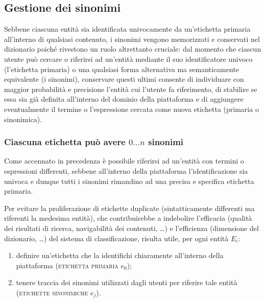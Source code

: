 \documentclass[10pt,a4paper,headinclude,footinclude,hidelinks]{scrreprt} %
\begin{document}

	\subsection{Gestione dei sinonimi}
	Sebbene ciascuna entità sia identificata univocamente da un'etichetta primaria all'interno di qualsiasi contenuto, i sinonimi vengono memorizzati e conservati nel dizionario poiché rivestono un ruolo altrettanto cruciale: dal momento che ciascun utente può cercare o riferirsi ad un'entità mediante il suo identificatore univoco (l'etichetta primaria) o una qualsiasi forma alternativa ma semanticamente equivalente (i sinonimi), conservare questi ultimi consente di individuare con maggior probabilità e precisione l'entità cui l'utente fa riferimento, di stabilire se essa sia già definita all'interno del dominio della piattaforma e di aggiungere eventualmente il termine o l'espressione cercata come nuova etichetta (primaria o sinonimica). 

	\subsubsection{Ciascuna etichetta può avere $0\ldots n$ sinonimi}
	Come accennato in precedenza è possibile riferirsi ad un'entità con termini o espressioni differenti, sebbene all'interno della piattaforma l'identificazione sia univoca e dunque tutti i sinonimi rimandino ad una precisa e specifica etichetta primaria.
	

	Per evitare la proliferazione di etichette duplicate (sintatticamente differenti ma riferenti la medesima entità), che contribuirebbe a indebolire l'efficacia (qualità dei risultati di ricerca, navigabilità dei contenuti, \ldots) e l'efficienza (dimensione del dizionario, \ldots) del sistema di classificazione, risulta utile, per ogni entità $E_i$:
	\begin{enumerate}
	\item definire un'etichetta che la identifichi chiaramente all'interno della piattaforma (\textsc{etichetta primaria} $e_0$);
	\item tenere traccia dei sinonimi utilizzati dagli utenti per riferire tale entità (\textsc{etichette sinonimiche} $e_j$).
	\end{enumerate}
\end{document}
